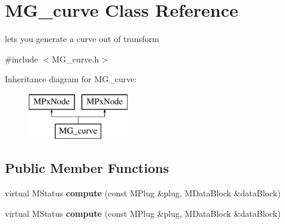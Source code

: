 \hypertarget{class_m_g__curve}{\section{M\-G\-\_\-curve Class Reference}
\label{class_m_g__curve}
}


lets you generate a curve out of transform  




{\ttfamily \#include $<$M\-G\-\_\-curve.\-h$>$}

Inheritance diagram for M\-G\-\_\-curve\-:\begin{figure}[H]
\begin{center}
\leavevmode
\includegraphics[height=2.000000cm]{class_m_g__curve}
\end{center}
\end{figure}
\subsection*{Public Member Functions}
\begin{DoxyCompactItemize}
\item 
\hypertarget{class_m_g__curve_aa9e2aace51476f58e756ab25b70c489a}{virtual M\-Status {\bfseries compute} (const M\-Plug \&plug, M\-Data\-Block \&data\-Block)}\label{class_m_g__curve_aa9e2aace51476f58e756ab25b70c489a}

\item 
\hypertarget{class_m_g__curve_aa9e2aace51476f58e756ab25b70c489a}{virtual M\-Status {\bfseries compute} (const M\-Plug \&plug, M\-Data\-Block \&data\-Block)}\label{class_m_g__curve_aa9e2aace51476f58e756ab25b70c489a}

\end{DoxyCompactItemize}
